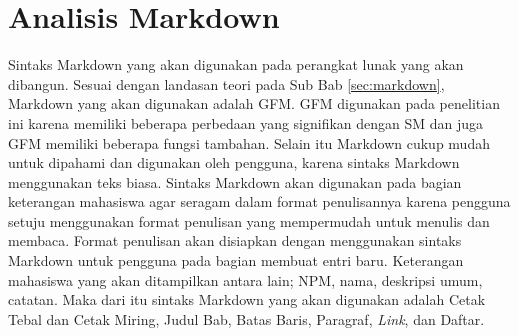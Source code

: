 \section{Analisis Markdown}
\label{sec:analisisMarkdown}
Sintaks Markdown yang akan digunakan pada perangkat lunak yang akan dibangun. Sesuai dengan landasan teori pada Sub Bab \ref{sec:markdown}, Markdown yang akan digunakan adalah GFM. GFM digunakan pada penelitian ini karena memiliki beberapa perbedaan yang signifikan dengan SM dan juga GFM memiliki beberapa fungsi tambahan. Selain itu Markdown cukup mudah untuk dipahami dan digunakan oleh pengguna, karena sintaks Markdown menggunakan teks biasa. Sintaks Markdown akan digunakan pada bagian keterangan mahasiswa agar seragam dalam format penulisannya karena pengguna setuju menggunakan format penulisan yang mempermudah untuk menulis dan membaca. Format penulisan akan disiapkan dengan menggunakan sintaks Markdown untuk pengguna pada bagian membuat entri baru. Keterangan mahasiswa yang akan ditampilkan antara lain; NPM, nama, deskripsi umum, catatan. Maka dari itu sintaks Markdown yang akan digunakan adalah Cetak Tebal dan Cetak Miring, Judul Bab, Batas Baris, Paragraf, {\it Link}, dan Daftar.

